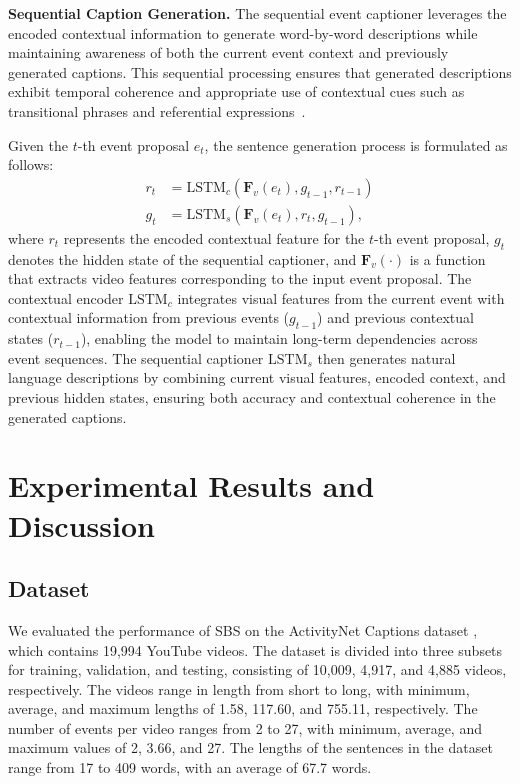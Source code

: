 \textbf{Sequential Caption Generation.}
The sequential event captioner leverages the encoded contextual information to generate word-by-word descriptions while maintaining awareness of both the current event context and previously generated captions. This sequential processing ensures that generated descriptions exhibit temporal coherence and appropriate use of contextual cues such as transitional phrases and referential expressions~\cite{Huang2020-as}.

Given the $t$-th event proposal $e_t$, the sentence generation process is formulated as follows:
\begin{align}
  r_t &= \text{LSTM}_c(\mathbf{F}_v(e_t), g_{t-1}, r_{t-1}) \\
  g_t &= \text{LSTM}_s(\mathbf{F}_v(e_t), r_t, g_{t-1}),
\end{align}
where $r_t$ represents the encoded contextual feature for the $t$-th event proposal, $g_t$ denotes the hidden state of the sequential captioner, and $\mathbf{F}_v(\cdot)$ is a function that extracts video features corresponding to the input event proposal. The contextual encoder $\text{LSTM}_c$ integrates visual features from the current event with contextual information from previous events ($g_{t-1}$) and previous contextual states ($r_{t-1}$), enabling the model to maintain long-term dependencies across event sequences. The sequential captioner $\text{LSTM}_s$ then generates natural language descriptions by combining current visual features, encoded context, and previous hidden states, ensuring both accuracy and contextual coherence in the generated captions.

\section{Experimental Results and Discussion}
\subsection{Dataset}
\label{subsec:exp_dataset}
We evaluated the performance of SBS on the ActivityNet Captions dataset \cite{krishna2017dense}, which contains 19,994 YouTube videos.
The dataset is divided into three subsets for training, validation, and testing, consisting of 10,009, 4,917, and 4,885 videos, respectively.
The videos range in length from short to long, with minimum, average, and maximum lengths of 1.58, 117.60, and 755.11, respectively.
The number of events per video ranges from 2 to 27, with minimum, average, and maximum values of 2, 3.66, and 27.
The lengths of the sentences in the dataset range from 17 to 409 words, with an average of 67.7 words.

